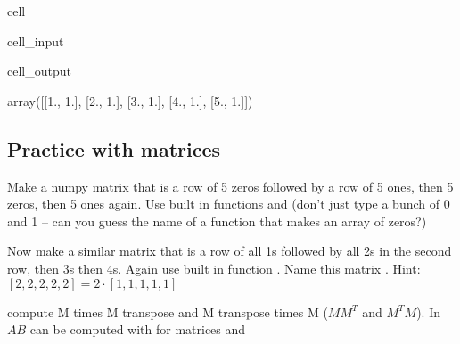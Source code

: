 \documentclass[letterpaper,10pt,english]{jupyterBook}
\begin{document}
\begin{sphinxuseclass}{cell}\begin{sphinxVerbatimInput}

\begin{sphinxuseclass}{cell_input}
\begin{sphinxVerbatim}[commandchars=\\\{\}]
\PYG{p}{[} \PYG{p}{]}
\end{sphinxVerbatim}

\end{sphinxuseclass}\end{sphinxVerbatimInput}
\begin{sphinxVerbatimOutput}

\begin{sphinxuseclass}{cell_output}
\begin{sphinxVerbatim}[commandchars=\\\{\}]
array([[1., 1.],
       [2., 1.],
       [3., 1.],
       [4., 1.],
       [5., 1.]])
\end{sphinxVerbatim}

\end{sphinxuseclass}\end{sphinxVerbatimOutput}

\end{sphinxuseclass}

\subsection{Practice with matrices}
\label{\detokenize{lessons/least-squares-01:practice-with-matrices}}
\sphinxAtStartPar
Make a numpy matrix that is a row of 5 zeros followed by a row of 5 ones, then 5 zeros, then 5 ones again. Use built in functions and  (don’t just type a bunch of 0 and 1 – can you guess the name of a function that makes an array of zeros?)

\sphinxAtStartPar
Now make a similar matrix that is a row of all 1s followed by all 2s in the second row, then 3s then 4s. Again use built in function . Name this matrix . Hint: \([2,2,2,2,2] = 2\cdot[1,1,1,1,1]\)

\sphinxAtStartPar
compute M times M transpose and M transpose times M (\(MM^T\) and \(M^TM\)). In  \(AB\) can be computed with  for matrices  and 
\end{document}
